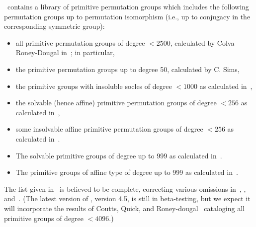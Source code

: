 \GAP\ contains a library of primitive permutation groups which includes the
following permutation groups up to permutation isomorphism (i.e., up to
conjugacy in the corresponding symmetric group):
\begin{itemize}
\item 
all primitive permutation groups of degree $< 2500$, calculated by Colva Roney-Dougal in~\cite{Roney-Dougal:2005}; in particular,
\item the primitive permutation groups up to degree 50, calculated by C. Sims,
\item the primitive groups with insoluble socles of degree $< 1000$ as calculated in~\cite{Dixon:1988},
\item the solvable (hence affine) primitive permutation groups of degree $< 256$ as calculated in~\cite{Short:1992},
\item some insolvable affine primitive permutation groups of degree $< 256$ as calculated in~\cite{Theissen:1997}.
\item The solvable primitive groups of degree up to 999 as calculated in~\cite{Eick:2002}.
\item The primitive groups of affine type of degree up to 999 as calculated in~\cite{Roney-Dougal:2003}.
\end{itemize}
The list given in~\cite{Roney-Dougal:2005} is believed to be complete,
correcting various omissions in~\cite{Dixon:1988}, \cite{Short:1992},
and~\cite{Theissen:1997}.  (The latest version of \GAP, version 4.5, is still in
beta-testing, but we expect it will incorporate the results
of Coutts, Quick, and Roney-dougal~\cite{Coutts_theprimitive} cataloging all
primitive groups of degree $< 4096$.)

